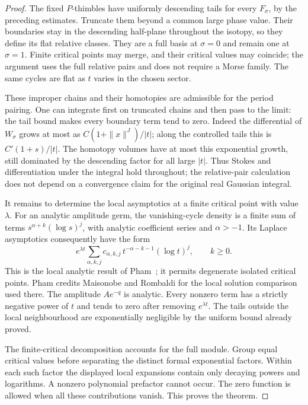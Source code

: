\begin{proof}
The fixed $P$-thimbles have uniformly descending tails for every
$F_\sigma$, by the preceding estimates. Truncate them beyond a common
large phase value. Their boundaries stay in the descending half-plane
throughout the isotopy, so they define its flat relative classes.
They are a full basis at $\sigma=0$ and remain one at $\sigma=1$.
Finite critical points may merge, and their critical values may
coincide; the argument uses the full relative pairs and does not
require a Morse family. The same cycles are flat as $t$ varies in
the chosen sector.

These improper chains and their homotopies are admissible for the
period pairing. One can integrate first on truncated chains and then
pass to the limit: the tail bound makes every boundary term tend to
zero. Indeed the differential of $W_\sigma$ grows at most as
$C(1+\|x\|^J)/|t|$; along the controlled tails this is
$C'(1+s)/|t|$. The homotopy volumes have at most this exponential
growth, still dominated by the descending factor for all large $|t|$.
Thus Stokes and differentiation under the integral hold throughout;
the relative-pair calculation does not depend on a convergence claim
for the original real Gaussian integral.

It remains to determine the local asymptotics at a finite critical
point with value $\lambda$. For an analytic amplitude germ, the
vanishing-cycle density is a finite sum of terms
$s^{\alpha+k}(\log s)^j$, with analytic coefficient series and
$\alpha>-1$. Its Laplace asymptotics consequently have the form
\[
 e^{\lambda t}\sum_{\alpha,k,j}
       c_{\alpha,k,j}\,t^{-\alpha-k-1}(\log t)^j,
 \qquad k\geq0.
\]
This is the local analytic result of
Pham~\cite[Part~II, Section~1.1, (1.5)--(1.6) and the footnote on
printed page~26]{Pham}; it permits degenerate isolated critical
points. Pham credits Maisonobe and Rombaldi for the local solution
comparison used there. The amplitude $A e^{-q}$ is analytic. Every nonzero
term has a strictly negative power of $t$ and tends to zero after
removing $e^{\lambda t}$. The tails outside the local neighbourhood
are exponentially negligible by the uniform bound already proved.

The finite-critical decomposition accounts for the full module.
Group equal critical values before separating the distinct formal
exponential factors. Within each such factor the displayed local
expansions contain only decaying powers and logarithms. A nonzero
polynomial prefactor cannot occur. The zero function is allowed when
all these contributions vanish. This proves the theorem.
\end{proof}

